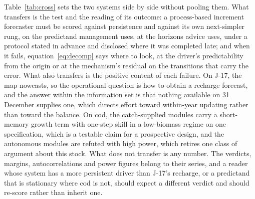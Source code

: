 \documentclass[preprint,11pt,authoryear]{elsarticle}
\theoremstyle{definition}
\theoremstyle{remark}
\begin{document}
Table~\ref{tab:cross} sets the two systems side by side without pooling them. What transfers is the test and the reading of its outcome: a process-based increment forecaster must be scored against persistence and against its own next-simpler rung, on the predictand management uses, at the horizons advice uses, under a protocol stated in advance and disclosed where it was completed late; and when it fails, equation~\eqref{eq:decomp} says where to look, at the driver's predictability from the origin or at the mechanism's residual on the transitions that carry the error. What also transfers is the positive content of each failure. On J-17, the map nowcasts, so the operational question is how to obtain a recharge forecast, and the answer within the information set is that nothing available on 31 December supplies one, which directs effort toward within-year updating rather than toward the balance. On cod, the catch-supplied modules carry a short-memory growth term with one-step skill in a low-biomass regime on one specification, which is a testable claim for a prospective design, and the autonomous modules are refuted with high power, which retires one class of argument about this stock. What does not transfer is any number. The verdicts, margins, autocorrelations and power figures belong to their series, and a reader whose system has a more persistent driver than J-17's recharge, or a predictand that is stationary where cod is not, should expect a different verdict and should re-score rather than inherit one.
\end{document}
